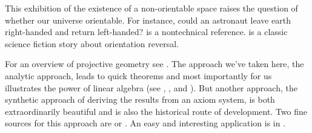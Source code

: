 This exhibition of the existence of a 
non-orientable space raises the question of whether our universe
orientable.
For instance, could 
an astronaut leave earth right-handed and return left-handed?
\cite{Gardner} is a nontechnical reference.
\cite{Clarke} is a classic science fiction story about 
orientation reversal.

For an overview of projective geometry see \cite{CourantRobbins}. 
The approach we've taken here, the analytic approach,
leads to quick theorems and \Dash  most importantly for us \Dash  illustrates 
the power of linear algebra (see \cite{Hanes}, \cite{Ryan}, and
\cite{Eggar}).
But another approach, the 
synthetic approach of deriving the results
from an axiom system, is both extraordinarily
beautiful and is also the historical route of development.
Two fine sources for this approach are \cite{Coxeter} or \cite{Seidenberg}.
An easy and interesting application is in \cite{Davies}.

